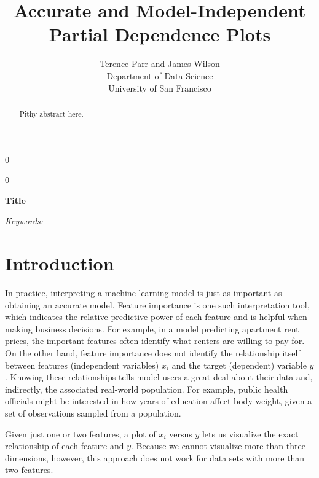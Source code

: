 \documentclass[12pt]{article}
\newcommand{\blind}{0}
\begin{document}
\def\spacingset#1{\renewcommand{\baselinestretch}%
{#1}\small\normalsize} \spacingset{1}



\blind
{
  \title{\bf Accurate and Model-Independent\\
  Partial Dependence Plots}

  \author{Terence Parr and James Wilson\\
      Department of Data Science\\
      University of San Francisco\\
}
  \maketitle
} \fi

\blind
{
  \bigskip
  \bigskip
  \bigskip
  \begin{center}
    {\LARGE\bf Title}
\end{center}
  \medskip
} \fi

\bigskip
\begin{abstract}
Pithy abstract here.
\end{abstract}

\noindent%
{\it Keywords:} 
\vfill

\newpage
\section{Introduction}
\label{sec:intro}

In practice, interpreting a machine learning model is just as important as obtaining an accurate model. Feature importance is one such interpretation tool, which indicates the relative predictive power of each feature and is helpful when making business decisions. For example, in a model predicting apartment rent prices, the important features often identify what renters are willing to pay for. On the other hand, feature importance does not identify the relationship itself between features (independent variables) $x_i$ and the target (dependent) variable $y$.  Knowing these relationships tells model users a great deal about their data and, indirectly, the associated real-world population. For example, public health officials might be interested in how years of education affect body weight, given a set of observations sampled from a population.

Given just one or two features, a plot of $x_i$ versus $y$ lets us visualize the exact relationship of each feature and $y$.  Because we cannot visualize more than three dimensions, however, this approach does not work for data sets with more than two features.
\end{document}
